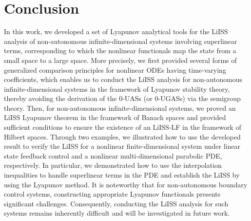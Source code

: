 \documentclass[onecolumn]{autart}
\newenvironment{proof of Prop.ODE}{{\it Proof of Proposition~\ref{Prop.ODE}:\enspace}}{\hfill $\blacksquare$\par}
\newenvironment{proof of PDE}{{\it Proof of Proposition \ref{Prop.8}:\enspace}}{\hfill $\blacksquare$\par}
\begin{document}
{{\section{Conclusion}\label{conclusion}


In this work, we developed a set of  Lyapunov analytical tools for the  LiISS analysis of    non-autonomous infinite-dimensional systems  involving superlinear terms, corresponding to which   the nonlinear functionals  map the state from a small space to a large space. More precisely,  we  first provided several forms of generalized comparison principles for  nonlinear ODEs having time-varying coefficients, which enables us to conduct the LiISS analysis for non-autonomous infinite-dimensional systems  in the framework of Lyapunov stability theory, thereby avoiding the derivation of the {0-UASs (or 0-UGASs)}  via the semigroup theory.  Then, for non-autonomous infinite-dimensional systems,
we proved  an LiISS Lyapunov theorem   in the framework of Banach spaces and  provided sufficient conditions to ensure the existence of an LiISS-LF    in the framework of Hilbert spaces.
Through two examples, we illustrated how to use the developed result to verify the LiISS for a nonlinear finite-dimensional system   under linear state feedback control   and   a   nonlinear multi-dimensional parabolic PDE, respectively. In particular, we  demonstrated how to use the interpolation inequalities to handle superlinear terms in  the PDE and establish the LiISS by using the Lyapunov method.
It is noteworthy that for non-autonomous   boundary control  systems, constructing appropriate Lyapunov functionals  presents significant challenges.  Consequently, conducting the LiISS
analysis for such systems remains inherently difficult and will be investigated in future work.











}}
\end{document}
